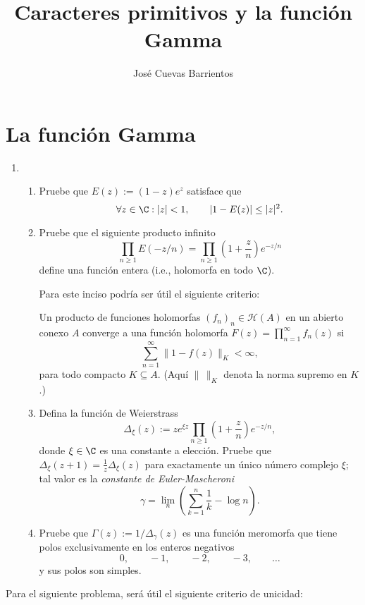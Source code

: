 \documentclass[11pt, reqno]{amsart}
\title{Caracteres primitivos y la función Gamma}
\date{\DTMdate{2025-10-03}}
\author[José Cuevas]{José Cuevas Barrientos}
\begin{document}
\maketitle

\section{La función Gamma}
\begin{enumerate}
	\item
		\begin{enumerate}
			\item Pruebe que $E(z) := (1 - z)e^z$ satisface que
				\[
					\forall z \in \C : |z| < 1, \qquad
					|1 - E(z)| \le |z|^2.
				\]

			\item Pruebe que el siguiente producto infinito
				\[
					\prod_{n \ge 1} E(-z/n) = \prod_{n \ge 1} \left( 1 + \frac{z}{n} \right) e^{-z/n}
				\]
				define una función entera (i.e., holomorfa en todo $\C$).

				Para este inciso podría ser útil el siguiente criterio:
				\begin{thm}
					Un producto de funciones holomorfas $(f_n)_n \in \mathcal{H}(A)$ en un abierto conexo $A$ converge a
					una función holomorfa $F(z) = \prod_{n=1}^{\infty} f_n(z)$ si
					\[
						\sum_{n=1}^{\infty} \|1 - f(z)\|_K < \infty,
					\]
					para todo compacto $K \subseteq A$.
					(Aquí $\|\,\|_K$ denota la norma supremo en $K$.)
				\end{thm}

				\newex
			\item Defina la función de Weierstrass
				\[
					\Delta_\xi(z) := z e^{\xi z} \prod_{n \ge 1} \left( 1 + \frac{z}{n} \right) e^{-z/n},
				\]
				donde $\xi \in \C$ es una constante a elección.
				Pruebe que $\Delta_\xi(z + 1) = \frac{1}{z} \Delta_\xi(z)$ para exactamente un único número complejo $\xi$;
				tal valor es la \emph{constante de Euler-Mascheroni}
				\[
					\gamma = \lim_n \left( \sum_{k=1}^{n} \frac{1}{k} - \log n \right).
				\]

			\item Pruebe que $\Gamma(z) := 1/\Delta_\gamma(z)$ es una función meromorfa que tiene polos exclusivamente en los enteros negativos
				\[
					0, \qquad -1, \qquad -2, \qquad -3, \qquad \dots
				\]
				y sus polos son simples.
		\end{enumerate}
\end{enumerate}
\newex
Para el siguiente problema, será útil el siguiente criterio de unicidad:
\end{document}
